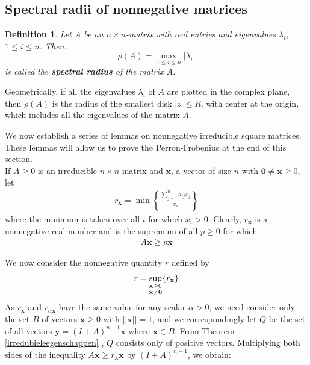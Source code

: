 \documentclass[a4paper,11pt]{report}
\newtheorem{definition}[theorem]{Definition}
\begin{document}
 
 \subsection{Spectral radii of nonnegative matrices}
 
 \begin{definition}
  Let A be an $n\times n$-matrix with real entries and eigenvalues $\lambda_i$,
  $1 \leq i \leq n$. Then:
  $$\rho(A) = \max_{1 \leq i \leq n} |\lambda_i|$$
  is called the \textbf{spectral radius} of the matrix $A$.
\end{definition}

Geometrically, if all the eigenvalues $\lambda_i$ of $A$ are plotted in the 
complex plane, then $\rho(A)$ is the radius of the smallest disk $|z| \leq 
R$, with center at the origin, which includes all the eigenvalues of the matrix 
$A$.

 We now establish a series of lemmas on nonnegative irreducible square matrices. 
 These lemmas will allow us to prove the Perron-Frobenius at the end of this
 section.\\
 
 If $A \geq 0$ is an irreducible $n\times n$-matrix and $\mathbf{x}$, a vector of size $n$ with $\mathbf{0} \not = \mathbf{x} \geq 0$, let
 \begin{eqnarray}
r_\mathbf{x} = \min\left\{\frac{\sum^n_{j=1}a_{ij}x_j}{x_i}\right\}
  \end{eqnarray}
 where the minimum is taken over all $i$ for which $x_i > 0$. Clearly, $r_\mathbf{x}$ is 
 a nonnegative real number and is the supremum of all $p \geq 0$ for 
 which 
  \begin{eqnarray}\label{eenvoudigefrob}
A\mathbf{x} \geq p\mathbf{x}  \end{eqnarray}
 
  We now consider the nonnegative quantity $r$ defined by 
 \begin{eqnarray}\label{eenvoudigefrob2}\label{quantityr}
   r = \sup_{\begin{subarray}{l}\mathbf{x} \geq 0\\
    \mathbf{x}\not = \mathbf{0}\end{subarray}} \{r_\mathbf{x}\}
 \end{eqnarray}
As $r_{\mathbf{x}}$ and $r_{\alpha\mathbf{x}}$ 
have the same value for any 
scalar $\alpha > 0$, we need consider only the set $B$ of vectors $\mathbf{x} \geq 0$ 
with $||\mathbf{x}|| = 1$, and we correspondingly let $Q$ be the set of all vectors $\mathbf{y}=(I+A)^{n-1}\mathbf{x}$ 
where $\mathbf{x} \in B$. From Theorem \ref{irredubieleegenschappen} , $Q$ 
consists only of positive vectors. Multiplying both sides of the inequality $A\mathbf{x} \geq r_{\mathbf{x}}\mathbf{x}$
by $(I+A)^{n-1}$, we obtain:
\end{document}
